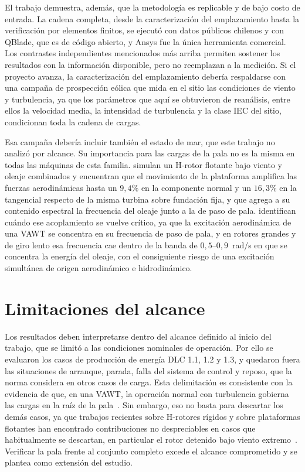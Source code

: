 El trabajo demuestra, además, que la metodología es replicable y de bajo costo de entrada. La cadena completa, desde la caracterización del emplazamiento hasta la verificación por elementos finitos, se ejecutó con datos públicos chilenos y con QBlade, que es de código abierto, y Ansys fue la única herramienta comercial. Los contrastes independientes mencionados más arriba permiten sostener los resultados con la información disponible, pero no reemplazan a la medición. Si el proyecto avanza, la caracterización del emplazamiento debería respaldarse con una campaña de prospección eólica que mida en el sitio las condiciones de viento y turbulencia, ya que los parámetros que aquí se obtuvieron de reanálisis, entre ellos la velocidad media, la intensidad de turbulencia y la clase IEC del sitio, condicionan toda la cadena de cargas.

Esa campaña debería incluir también el estado de mar, que este trabajo no analizó por alcance. Su importancia para las cargas de la pala no es la misma en todas las máquinas de esta familia. \textcite{Guo2018} simulan un H-rotor flotante bajo viento y oleaje combinados y encuentran que el movimiento de la plataforma amplifica las fuerzas aerodinámicas hasta un $9{,}4\%$ en la componente normal y un $16{,}3\%$ en la tangencial respecto de la misma turbina sobre fundación fija, y que agrega a su contenido espectral la frecuencia del oleaje junto a la de paso de pala. \textcite{Borg2015} identifican cuándo ese acoplamiento se vuelve crítico, ya que la excitación aerodinámica de una VAWT se concentra en su frecuencia de paso de pala, y en rotores grandes y de giro lento esa frecuencia cae dentro de la banda de $0{,}5$--$0{,}9$~rad/s en que se concentra la energía del oleaje, con el consiguiente riesgo de una excitación simultánea de origen aerodinámico e hidrodinámico.

\section{Limitaciones del alcance}

Los resultados deben interpretarse dentro del alcance definido al inicio del trabajo, que se limitó a las condiciones nominales de operación. Por ello se evaluaron los casos de producción de energía DLC 1.1, 1.2 y 1.3, y quedaron fuera las situaciones de arranque, parada, falla del sistema de control y reposo, que la norma considera en otros casos de carga. Esta delimitación es consistente con la evidencia de que, en una VAWT, la operación normal con turbulencia gobierna las cargas en la raíz de la pala~\parencite{Galinos2016,Sutherland2012}. Sin embargo, eso no basta para descartar los demás casos, ya que trabajos recientes sobre H-rotores rígidos y sobre plataformas flotantes han encontrado contribuciones no despreciables en casos que habitualmente se descartan, en particular el rotor detenido bajo viento extremo~\parencite{Moore2024,Sakib2022}. Verificar la pala frente al conjunto completo excede el alcance comprometido y se plantea como extensión del estudio.

